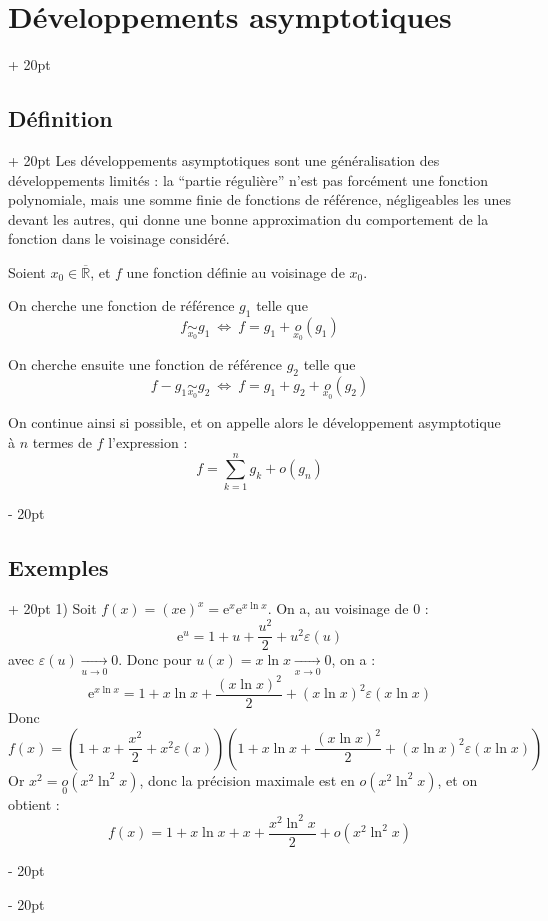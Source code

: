 \documentclass[a4paper, 12pt, twoside]{article}
\newcommand{\R}{\mathbb{R}} %
\newcommand{\lr}[1]{\left( #1 \right)}
\newcommand{\e}{\mathrm{e}}
\newcommand{\cj}[1]{\overline{#1}} %
\newcommand{\tendsto}[1]{\xrightarrow[#1]{}}
\newcommand{\ssi}{\ \Leftrightarrow \ }
\newcommand{\ind}[1][20pt]{\advance\leftskip + #1}
\newcommand{\deind}[1][20pt]{\advance\leftskip - #1}
\newenvironment{indt}[2][20pt]{#2 \par \ind[#1]}{\par \deind} %
\begin{document}
    \begin{indt}{\section{Développements asymptotiques}}
        
        \begin{indt}{\subsection{Définition}}
            Les développements asymptotiques sont une généralisation des développements limités : la ``partie régulière'' n'est pas forcément une fonction polynomiale, mais une somme finie de fonctions de référence, négligeables les unes devant les autres, qui donne une bonne approximation du comportement de la fonction dans le voisinage considéré. %
            
            \vspace{12pt}
            
            Soient $x_0 \in \cj\R$, et $f$ une fonction définie au voisinage de $x_0$.
            
            On cherche une fonction de référence $g_1$ telle que
                \[ f \underset{x_0}{\sim} g_1 \ssi f = g_1 + \underset{x_0}{o}(g_1) \]
            
            On cherche ensuite une fonction de référence $g_2$ telle que
                \[ f - g_1 \underset{x_0}{\sim} g_2 \ssi f = g_1 + g_2 + \underset{x_0}{o}(g_2) \]
            
            On continue ainsi si possible, et on appelle alors le développement asymptotique à $n$ termes de $f$ l'expression :
                \[ f = \sum_{k = 1}^n g_k + o(g_n) \]
        \end{indt}
        
        \vspace{12pt}
        
        \begin{indt}{\subsection{Exemples}}
            1) Soit $f(x) = (x\e)^x = \e^x \e^{x\ln x}$. On a, au voisinage de 0 :
                \[ \e^u = 1 + u + \dfrac{u^2}{2} + u^2 \varepsilon(u) \]
            avec $\varepsilon(u) \tendsto{u \to 0} 0$. Donc pour $u(x) = x\ln x \tendsto{x \to 0} 0$, on a :
                \[ \e^{x \ln x} = 1 + x \ln x + \dfrac{(x\ln x)^2}{2} + (x \ln x)^2 \varepsilon(x \ln x) \]
            Donc
                \[
                    f(x) =
                    \lr{ 1 + x + \dfrac{x^2}{2} + x^2 \varepsilon(x) }
                    \lr{ 1 + x \ln x + \dfrac{(x\ln x)^2}{2} + (x \ln x)^2 \varepsilon(x \ln x) }
                \]
            Or $x^2 = \underset{0}{o}(x^2\ln^2 x)$, donc la précision maximale est en $o(x^2\ln^2 x)$, et on obtient :
                \[ f(x) = 1 + x\ln x + x + \dfrac{x^2 \ln^2 x}{2} + o(x^2\ln^2 x) \]
            

\end{indt}
\end{indt}
\end{document}
